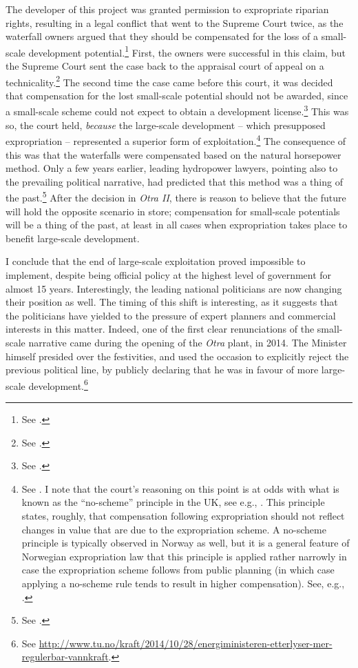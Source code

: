 The developer of this project was granted permission to expropriate riparian rights, resulting in a legal conflict that went to the Supreme Court twice, as the waterfall owners argued that they should be compensated for the loss of a small-scale development potential.\footnote{See \cite{otra10,otra13}.} First, the owners were successful in this claim, but the Supreme Court sent the case back to the appraisal court of appeal on a technicality.\footnote{See \cite{otra10}.} The second time the case came before this court, it was decided that compensation for the lost small-scale potential should not be awarded, since a small-scale scheme could not expect to obtain a development license.\footnote{See \cite{otra13}.} This was so, the court held, {\it because} the large-scale development -- which presupposed expropriation -- represented a superior form of exploitation.\footnote{See \cite{otra13}. I note that the court's reasoning on this point is at odds with what is known as the ``no-scheme'' principle in the UK, see e.g., \cite{lawcom01}. This principle states, roughly, that compensation following expropriation should not reflect changes in value that are due to the expropriation scheme. A no-scheme principle is typically observed in Norway as well, but it is a general feature of Norwegian expropriation law that this principle is applied rather narrowly in case the expropriation scheme follows from public planning (in which case applying a no-scheme rule tends to result in higher compensation). See, e.g., \cite{stordrange07}.} The consequence of this was that the waterfalls were compensated based on the natural horsepower method. Only a few years earlier, leading hydropower lawyers, pointing also to the prevailing political narrative, had predicted that this method was a thing of the past.\footnote{See \cite{larsen12}.} After the decision in {\it Otra II}, there is reason to believe that the future will hold the opposite scenario in store; compensation for small-scale potentials will be a thing of the past, at least in all cases when expropriation takes place to benefit large-scale development.

I conclude that the end of large-scale exploitation proved impossible to implement, despite being official policy at the highest level of government for almost 15 years. Interestingly, the leading national politicians are now changing their position as well. The timing of this shift is interesting,  as it suggests that the politicians have yielded to the pressure of expert planners and commercial interests in this matter. Indeed, one of the first clear renunciations of the small-scale narrative came during the opening of the {\it Otra} plant, in 2014. The Minister himself presided over the festivities, and used the occasion to explicitly reject the previous political line, by publicly declaring that he was in favour of more large-scale development.\footnote{See \url{http://www.tu.no/kraft/2014/10/28/energiministeren-etterlyser-mer-regulerbar-vannkraft}.}

